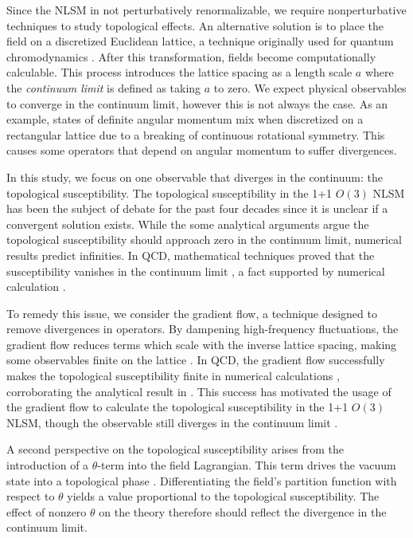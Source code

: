 Since the NLSM in not perturbatively renormalizable, we require nonperturbative techniques to study topological effects. An alternative solution is to place the field on a discretized Euclidean lattice, a technique originally used for quantum chromodynamics \cite{wilson1974}. After this transformation, fields become computationally calculable. This process introduces the lattice spacing as a length scale $a$ where the \textit{continuum limit} is defined as taking $a$ to zero. We expect physical observables to converge in the continuum limit, however this is not always the case. As an example, states of definite angular momentum mix when discretized on a rectangular lattice due to a breaking of continuous rotational symmetry. This causes some operators that depend on angular momentum to suffer divergences.

In this study, we focus on one observable that diverges in the continuum: the topological susceptibility. The topological susceptibility in the 1+1 $O(3)$ NLSM has been the subject of debate for the past four decades \cite{bietenholz2018} since it is unclear if a convergent solution exists. While the some analytical arguments argue the topological susceptibility should approach zero in the continuum limit, numerical results predict infinities. In QCD, mathematical techniques proved that the susceptibility vanishes in the continuum limit \cite{giusti2004}, a fact supported by numerical calculation \cite{giusti2004}.

To remedy this issue, we consider the gradient flow, a technique designed to remove divergences in operators. By dampening high-frequency fluctuations, the gradient flow reduces terms which scale with the inverse lattice spacing, making some observables finite on the lattice \cite{monahan2016}. In QCD, the gradient flow successfully makes the topological susceptibility finite in numerical calculations \cite{bruno2014}, corroborating the analytical result in \cite{giusti2004}. This success has motivated the usage of the gradient flow to calculate the topological susceptibility in the 1+1 $O(3)$ NLSM, though the observable still diverges in the continuum limit \cite{bietenholz2018}. 

A second perspective on the topological susceptibility arises from the introduction of a $\theta$-term into the field Lagrangian. This term drives the vacuum state into a topological phase \cite{allessalom2008}. Differentiating the field's partition function with respect to $\theta$ yields a value proportional to the topological susceptibility. The effect of nonzero $\theta$ on the theory therefore should reflect the divergence in the continuum limit.

